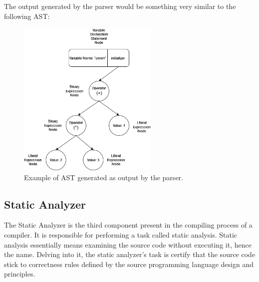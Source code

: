 The output generated by the parser would be something very similar to the following AST:

\begin{figure}[H]  
  \centering
  \includegraphics[width=0.6\textwidth, height=0.6\textheight, keepaspectratio]{Figures/Arquiteturas/ParserOutput.png}  
  \caption{Example of AST generated as output by the parser.}
  \label{fig:CompilersAndInterpreters}
\end{figure}

\subsection{Static Analyzer}
The Static Analyzer is the third component present in the compiling process of a compiler. It is responsible for performing a task called static analysis. Static analysis essentially means examining the source code without executing it, hence the name. Delving into it, the static analyzer's task is certify that the source code stick to correctness rules defined by the source programming language design and principles.

